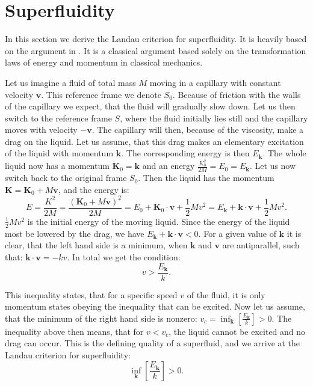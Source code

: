 \section{Superfluidity} \label{sec.Superfluidity}
In this section we derive the Landau criterion for superfluidity. It is heavily based on the argument in \cite[pp. 88-90]{LandauStatPhys2}. It is a classical argument based solely on the transformation laws of energy and momentum in classical mechanics. 

Let us imagine a fluid of total mass $M$ moving in a capillary with constant velocity $\mathbf{v}$. This reference frame we denote $S_0$. Because of friction with the walls of the capillary we expect, that the fluid will gradually slow down. Let us then switch to the reference frame $S$, where the fluid initially lies still and the capillary moves with velocity $-\mathbf{v}$. The capillary will then, because of the viscosity, make a drag on the liquid. Let us assume, that this drag makes an elementary excitation of the liquid with momentum $\mathbf{k}$. The corresponding energy is then $E_{\mathbf{k}}$. The whole liquid now has a momentum $\mathbf{K}_0 = \mathbf{k}$ and an energy $\frac{K_0^2}{2M} = E_0 = E_{\mathbf{k}}$. Let us now switch back to the original frame $S_0$. Then the liquid has the momentum $\mathbf{K} = \mathbf{K}_0 + M\mathbf{v}$, and the energy is:
\begin{equation}
E = \frac{K^2}{2M} = \frac{(\mathbf{K}_0 + M\mathbf{v})^2}{2M} = E_0 + \mathbf{K}_0\cdot \mathbf{v} + \frac{1}{2}Mv^2 = E_{\mathbf{k}} + \mathbf{k} \cdot \mathbf{v} + \frac{1}{2}Mv^2 . \nonumber
\end{equation}
$\frac{1}{2}Mv^2$ is the initial energy of the moving liquid. Since the energy of the liquid most be lowered by the drag, we have $E_{\mathbf{k}} + \mathbf{k} \cdot \mathbf{v} < 0 $. For a given value of $\mathbf{k}$ it is clear, that the left hand side is a minimum, when $\mathbf{k}$ and $\mathbf{v}$ are antiparallel, such that: $ \mathbf{k}\cdot \mathbf{v} = -kv$. In total we get the condition:
\begin{equation}
v > \frac{E_{\mathbf{k}}}{k}. \nonumber
\end{equation}

This inequality states, that for a specific speed $v$ of the fluid, it is only momentum states obeying the inequality that can be excited. Now let us assume, that the minimum of the right hand side is nonzero: $v_c = \inf_{\mathbf{k}}\left[\frac{E_{\mathbf{k}}}{k} \right] > 0$. The inequality above then means, that for $v < v_c$, the liquid cannot be excited and no drag can occur. This is the defining quality of a superfluid, and we arrive at the Landau criterion for superfluidity:
\begin{equation}
\inf_{\mathbf{k}}\left[\frac{E_{\mathbf{k}}}{k} \right] > 0.
\end{equation}


